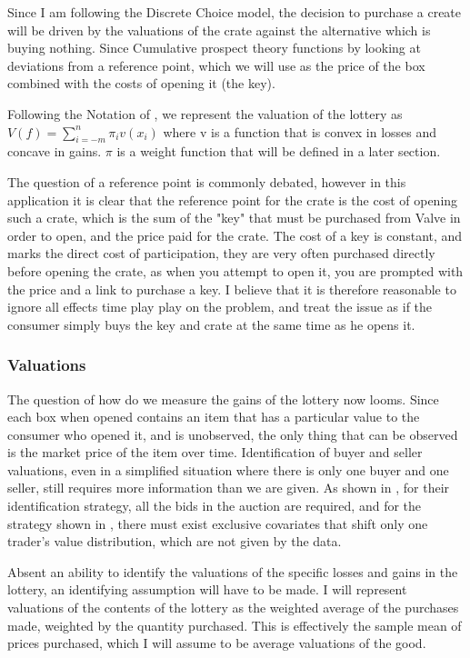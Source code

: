 \documentclass[11pt]{article}
\begin{document}
Since I am following the Discrete Choice model, the decision to
purchase a create will be driven by the valuations of the crate
against the alternative which is buying nothing. Since Cumulative
prospect theory functions by looking at deviations from a reference
point, which we will use as the price of the box combined with the
costs of opening it (the key).

Following the Notation of \cite{Kahn}, we represent the valuation of the
lottery as $V(f) = \sum_{i=-m}^n \pi_i v(x_i)$ where v is a function that is
convex in losses and concave in gains. $\pi$ is a weight function that
will be defined in a later section.

The question of a reference point is commonly debated, however in this
application it is clear that the reference point for the crate is the
cost of opening such a crate, which is the sum of the "key" that must
be purchased from Valve in order to open, and the price paid for the
crate. The cost of a key is constant, and marks the direct cost of
participation, they are very often purchased directly before opening
the crate, as when you attempt to open it, you are prompted with the
price and a link to purchase a key. I believe that it is therefore
reasonable to ignore all effects time play play on the problem, and
treat the issue as if the consumer simply buys the key and crate at
the same time as he opens it. 

\subsubsection{Valuations}
\label{sec-2-3-1}
The question of how do we measure the gains of the lottery now
looms. Since each box when opened contains an item that has a
particular value to the consumer who opened it, and is unobserved, the
only thing that can be observed is the market price of the item over
time. Identification of buyer and seller valuations, even in a
simplified situation where there is only one buyer and one seller,
still requires more information than we are given. As shown in
\cite{NonParIdent}, for their identification strategy, all the bids in
the auction are required, and for the strategy shown in
\cite{PriceDataOnly}, there must exist exclusive covariates that shift
only one trader's value distribution, which are not given by the data. 

Absent an ability to identify the valuations of the specific losses
and gains in the lottery, an identifying assumption will have to be
made. I will represent valuations of the contents of the lottery as
the weighted average of the purchases made, weighted by the quantity
purchased. This is effectively the sample mean of prices purchased,
which I will assume to be average valuations of the good. 
\end{document}
